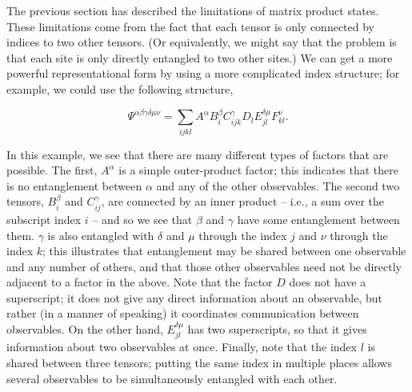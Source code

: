 \documentclass[12pt]{amsbook}
\theoremstyle{plain}
\theoremstyle{definition}
\theoremstyle{remark}
\newcommand{\eqn}[2][]{\begin{equation}\label{#1}#2\end{equation}}
\begin{document}
The previous section has described the limitations of matrix product states.  These limitations come from the fact that each tensor is only connected by indices to two other tensors.  (Or equivalently, we might say that the problem is that each site is only directly entangled to two other sites.)  We can get a more powerful representational form by using a more complicated index structure; for example, we could use the following structure,

\eqn[crazy-tensor-product]{\Psi^{\alpha\beta\gamma\delta\mu\nu} =
  \sum_{ijkl} A^\alpha B^{\beta}_{i} C^{\gamma}_{ijk} D_{l} E_{jl}^{\delta\mu} F_{kl}^{\nu}.}

In this example, we see that there are many different types of factors that are possible.  The first, $A^\alpha$ is a simple outer-product factor;  this indicates that there is no entanglement between $\alpha$ and any of the other observables.  The second two tensors, $B^\beta_i$ and $C^\gamma_{ij}$, are connected by an inner product -- i.e., a sum over the subscript index $i$ -- and so we see that $\beta$ and $\gamma$ have some entanglement between them.  $\gamma$ is also entangled with $\delta$ and $\mu$ through the index $j$ and $\nu$ through the index $k$;  this illustrates that entanglement may be shared between one observable and any number of others, and that those other observables need not be directly adjacent to a factor in the above.  Note that the factor $D$ does not have a superscript;  it does not give any direct information about an observable, but rather (in a manner of speaking) it coordinates communication between observables.  On the other hand, $E_{jl}^{\delta\mu}$ has two superscripts, so that it gives information about two observables at once.  Finally, note that the index $l$ is shared between three tensors;  putting the same index in multiple places allows several observables to be simultaneously entangled with each other.
\end{document}
